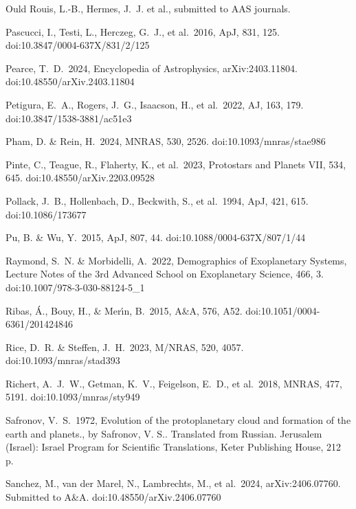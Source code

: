 \documentclass[useAMS,usenatbib]{mn2e}
\begin{document}
\begin{thebibliography}{99}
 Ould Rouis, L.-B., Hermes, J.~J. et al., submitted to AAS journals.

 Pascucci, I., Testi, L., Herczeg, G.~J., et al.\ 2016, ApJ, 831, 125. doi:10.3847/0004-637X/831/2/125

 Pearce, T.~D.\ 2024, Encyclopedia of Astrophysics, arXiv:2403.11804. doi:10.48550/arXiv.2403.11804

 Petigura, E.~A., Rogers, J.~G., Isaacson, H., et al.\ 2022, AJ, 163, 179. doi:10.3847/1538-3881/ac51e3

 Pham, D. \& Rein, H.\ 2024, MNRAS, 530, 2526. doi:10.1093/mnras/stae986

 Pinte, C., Teague, R., Flaherty, K., et al.\ 2023, Protostars and Planets VII, 534, 645. doi:10.48550/arXiv.2203.09528

 Pollack, J.~B., Hollenbach, D., Beckwith, S., et al.\ 1994, ApJ, 421, 615. doi:10.1086/173677

 Pu, B. \& Wu, Y.\ 2015, ApJ, 807, 44. doi:10.1088/0004-637X/807/1/44

 Raymond, S.~N. \& Morbidelli, A.\ 2022, Demographics of Exoplanetary Systems, Lecture Notes of the 3rd Advanced School on Exoplanetary Science, 466, 3. doi:10.1007/978-3-030-88124-5\_1

 Ribas, {\'A}., Bouy, H., \& Mer{\'\i}n, B.\ 2015, A\&A, 576, A52. doi:10.1051/0004-6361/201424846

 Rice, D.~R. \& Steffen, J.~H.\ 2023, M/NRAS, 520, 4057. doi:10.1093/mnras/stad393

 Richert, A.~J.~W., Getman, K.~V., Feigelson, E.~D., et al.\ 2018, MNRAS, 477, 5191. doi:10.1093/mnras/sty949

 Safronov, V.~S.\ 1972, Evolution of the protoplanetary cloud and formation of the earth and planets., by Safronov, V. S.. Translated from Russian. Jerusalem (Israel): Israel Program for Scientific Translations, Keter Publishing House, 212 p.

 Sanchez, M., van der Marel, N., Lambrechts, M., et al.\ 2024, arXiv:2406.07760. Submitted to A\&A. doi:10.48550/arXiv.2406.07760


\end{thebibliography}
\end{document}
